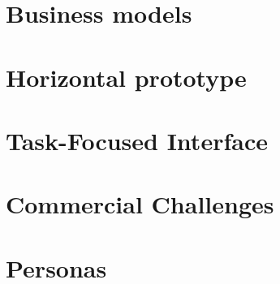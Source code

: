 \documentclass[a4paper,11pt,fleqn,dvipsnames,oneside,openright]{memoir}
\begin{document}
\section{Business models}
\label{BusinessModels}


\section{Horizontal prototype}
\label{HorizontalPrototype}


\section{Task-Focused Interface}
\label{TaskFocusedInterface}


\section{Commercial Challenges}
\label{CommercialChallenges}


\section{Personas}
\label{Personas}

\end{document}
